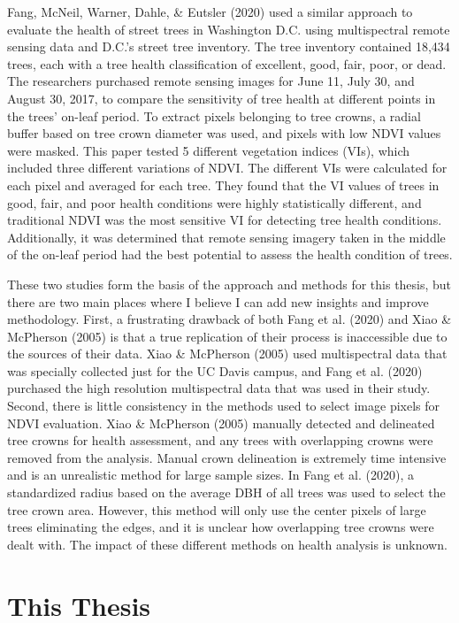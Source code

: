 \documentclass[12pt,twoside]{reedthesis}
\begin{document}
Fang, McNeil, Warner, Dahle, \& Eutsler (2020) used a similar approach to evaluate the health of street trees
in Washington D.C. using multispectral remote sensing data and D.C.'s
street tree inventory. The tree inventory contained 18,434 trees, each
with a tree health classification of excellent, good, fair, poor, or
dead. The researchers purchased remote sensing images for June 11, July
30, and August 30, 2017, to compare the sensitivity of tree health at
different points in the trees' on-leaf period. To extract pixels
belonging to tree crowns, a radial buffer based on tree crown diameter
was used, and pixels with low NDVI values were masked. This paper tested
5 different vegetation indices (VIs), which included three different
variations of NDVI. The different VIs were calculated for each pixel and
averaged for each tree. They found that the VI values of trees in good,
fair, and poor health conditions were highly statistically different,
and traditional NDVI was the most sensitive VI for detecting tree health
conditions. Additionally, it was determined that remote sensing imagery
taken in the middle of the on-leaf period had the best potential to
assess the health condition of trees.

These two studies form the basis of the approach and methods for this
thesis, but there are two main places where I believe I can add new
insights and improve methodology. First, a frustrating drawback of both
Fang et al. (2020) and Xiao \& McPherson (2005) is that a true replication of their process is
inaccessible due to the sources of their data. Xiao \& McPherson (2005) used
multispectral data that was specially collected just for the UC Davis
campus, and Fang et al. (2020) purchased the high resolution multispectral data
that was used in their study. Second, there is little consistency in the
methods used to select image pixels for NDVI evaluation. Xiao \& McPherson (2005)
manually detected and delineated tree crowns for health assessment, and
any trees with overlapping crowns were removed from the analysis. Manual
crown delineation is extremely time intensive and is an unrealistic
method for large sample sizes. In Fang et al. (2020), a standardized radius based
on the average DBH of all trees was used to select the tree crown area.
However, this method will only use the center pixels of large trees
eliminating the edges, and it is unclear how overlapping tree crowns
were dealt with. The impact of these different methods on health
analysis is unknown.

\hypertarget{this-thesis}{%
\section{This Thesis}\label{this-thesis}}
\end{document}
